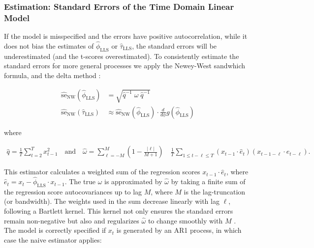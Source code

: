 \documentclass[main.tex]{subfiles}
\begin{document}
\subsubsection{Estimation: Standard Errors of the Time Domain Linear Model}

If the model is misspecified and the errors have positive autocorrelation, while it does not bias the estimates of $\hat\phi_{\scriptscriptstyle\text{LLS}}$ or $\hat\tau_{\scriptscriptstyle\text{LLS}}$, the standard errors will be underestimated (and the t-scores overestimated). To consistently estimate the standard errors for more general processes we apply the Newey-West sandwhich formula, and the delta method \citep{newey_simple_1987}:

\begin{align}
\widehat{\text{se}}_{\text{NW}}(\hat\phi_{\scriptscriptstyle\text{LLS}}) &= \sqrt{\hat q^{-1}\;\hat\omega\; \hat q^{-1}}\\
\widehat{\text{se}}_{\text{NW}}(\hat\tau_{\scriptscriptstyle\text{LLS}}) &\approx \widehat{\text{se}}_{\text{NW}}(\hat\phi_{\scriptscriptstyle\text{LLS}}) \cdot \frac{d}{d\phi} g(\hat\phi_{\scriptscriptstyle\text{LLS}})
\end{align}

\noindent where

\begin{align*}
    \hat q = \frac{1}{T} \sum_{t=2}^T x_{t-1}^2 \quad\text{and}\quad
    \hat \omega = \sum_{\ell=-M}^M (1 - \frac{|\ell|}{M+1}) \quad \frac{1}{T} \sum_{1\le t - \ell \le T} (x_{t-1} \cdot \hat e_t)(x_{t-1-\ell} \cdot \hat e_{t-\ell}).
\end{align*}

This estimator calculates a weighted sum of the regression scores $x_{t-1} \cdot \hat e_t$, where $\hat e_t = x_t - \hat\phi_{\scriptscriptstyle\text{LLS}} \cdot x_{t-1}$. The true $\omega$ is approximated by $\hat \omega$ by taking a finite sum of the regression score autocovariances up to lag $M$, where $M$ is the lag-truncation (or bandwidth). The weights used in the sum decrease linearly with lag $\ell$, following a Bartlett kernel. This kernel not only ensures the standard errors remain non-negative but also and regularizes $\hat \omega$ to change smoothly with $M$ \citep[chapter~14.35]{hansen_econometrics_2022}.\\


The model is correctly specified if $x_t$ is generated by an AR1 process, in which case the naive estimator applies:
\end{document}
